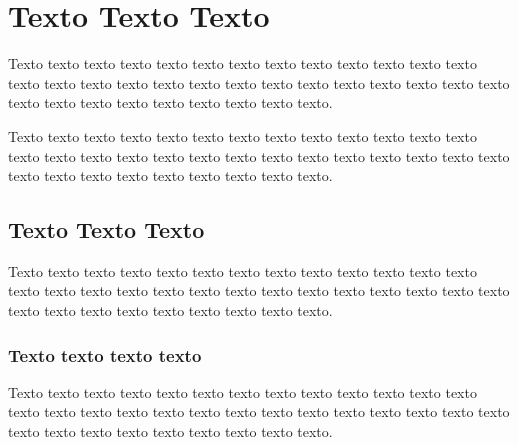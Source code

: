 \section{Texto Texto Texto}
\label{objetivos}
Texto texto texto texto texto texto texto texto texto texto texto texto texto texto texto texto texto texto texto texto texto texto texto texto texto texto texto texto texto texto texto texto texto texto texto texto.

Texto texto texto texto texto texto texto texto texto texto texto texto texto texto texto texto texto texto texto texto texto texto texto texto texto texto texto texto texto texto texto texto texto texto texto texto.

\subsection{Texto Texto Texto}
\label{sub:exemplonivel3}

Texto texto texto texto texto texto texto texto texto texto texto texto texto texto texto texto texto texto texto texto texto texto texto texto texto texto texto texto texto texto texto texto texto texto texto texto.

\subsubsection{Texto texto texto texto}
\label{subsub:exemplonivel4}

Texto texto texto texto texto texto texto texto texto texto texto texto texto texto texto texto texto texto texto texto texto texto texto texto texto texto texto texto texto texto texto texto texto texto texto texto.
